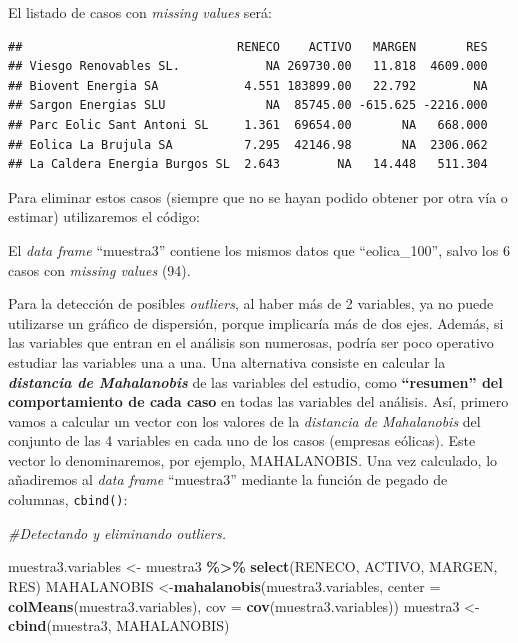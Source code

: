 \documentclass[
]{book}
\newenvironment{Shaded}{\begin{snugshade}}{\end{snugshade}}
\newcommand{\AttributeTok}[1]{\textcolor[rgb]{0.13,0.29,0.53}{#1}}
\newcommand{\CommentTok}[1]{\textcolor[rgb]{0.56,0.35,0.01}{\textit{#1}}}
\newcommand{\FunctionTok}[1]{\textcolor[rgb]{0.13,0.29,0.53}{\textbf{#1}}}
\newcommand{\NormalTok}[1]{#1}
\newcommand{\OtherTok}[1]{\textcolor[rgb]{0.56,0.35,0.01}{#1}}
\newcommand{\SpecialCharTok}[1]{\textcolor[rgb]{0.81,0.36,0.00}{\textbf{#1}}}
\begin{document}
El listado de casos con \emph{missing values} será:

\begin{verbatim}
##                              RENECO    ACTIVO   MARGEN       RES
## Viesgo Renovables SL.            NA 269730.00   11.818  4609.000
## Biovent Energia SA            4.551 183899.00   22.792        NA
## Sargon Energias SLU              NA  85745.00 -615.625 -2216.000
## Parc Eolic Sant Antoni SL     1.361  69654.00       NA   668.000
## Eolica La Brujula SA          7.295  42146.98       NA  2306.062
## La Caldera Energia Burgos SL  2.643        NA   14.448   511.304
\end{verbatim}

Para eliminar estos casos (siempre que no se hayan podido obtener por otra vía o estimar) utilizaremos el código:

El \emph{data frame} ``muestra3'' contiene los mismos datos que ``eolica\_100'', salvo los 6 casos con \emph{missing values} (94).

Para la detección de posibles \emph{outliers}, al haber más de 2 variables, ya no puede utilizarse un gráfico de dispersión, porque implicaría más de dos ejes. Además, si las variables que entran en el análisis son numerosas, podría ser poco operativo estudiar las variables una a una. Una alternativa consiste en calcular la \textbf{\emph{distancia de Mahalanobis}} de las variables del estudio, como \textbf{``resumen'' del comportamiento de cada caso} en todas las variables del análisis. Así, primero vamos a calcular un vector con los valores de la \emph{distancia de} \emph{Mahalanobis} del conjunto de las 4 variables en cada uno de los casos (empresas eólicas). Este vector lo denominaremos, por ejemplo, MAHALANOBIS\emph{.} Una vez calculado, lo añadiremos al \emph{data frame} ``muestra3'' mediante la función de pegado de columnas, \texttt{cbind()}:

\begin{Shaded}
\begin{Highlighting}[]
\CommentTok{\#Detectando y eliminando outliers.}

\NormalTok{muestra3.variables }\OtherTok{\textless{}{-}}\NormalTok{ muestra3 }\SpecialCharTok{\%\textgreater{}\%} \FunctionTok{select}\NormalTok{(RENECO, ACTIVO, MARGEN, RES)}
\NormalTok{MAHALANOBIS }\OtherTok{\textless{}{-}}\FunctionTok{mahalanobis}\NormalTok{(muestra3.variables,}
                          \AttributeTok{center =} \FunctionTok{colMeans}\NormalTok{(muestra3.variables),}
                          \AttributeTok{cov =} \FunctionTok{cov}\NormalTok{(muestra3.variables))}
\NormalTok{muestra3 }\OtherTok{\textless{}{-}} \FunctionTok{cbind}\NormalTok{(muestra3, MAHALANOBIS)}
\end{Highlighting}
\end{Shaded}
\end{document}

